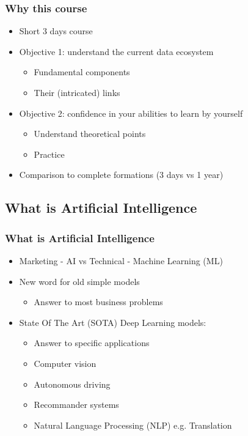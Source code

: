 \begin{frame}\frametitle{Why this course}
   \begin{itemize}
      \item Short 3 days course
      \item Objective 1: understand the current data ecosystem
      \begin{itemize}
         \item Fundamental components
         \item Their (intricated) links
      \end{itemize}
      \item Objective 2: confidence in your abilities to learn by yourself
      \begin{itemize}
         \item Understand theoretical points
         \item Practice
      \end{itemize}
      \item Comparison to complete formations (3 days vs 1 year)
   \end{itemize}
\end{frame}


\subsection{What is Artificial Intelligence}
\begin{frame}\frametitle{What is Artificial Intelligence}
   \begin{itemize}
      \item Marketing - AI vs Technical - Machine Learning (ML)
      \item New word for old simple models
      \begin{itemize}
         \item Answer to most business problems
      \end{itemize}
      \item State Of The Art (SOTA) Deep Learning models:
      \begin{itemize}
         \item Answer to specific applications
         \item Computer vision
         \item Autonomous driving
         \item Recommander systems
         \item Natural Language Processing (NLP) e.g. Translation
      \end{itemize}
   \end{itemize}
\end{frame}


